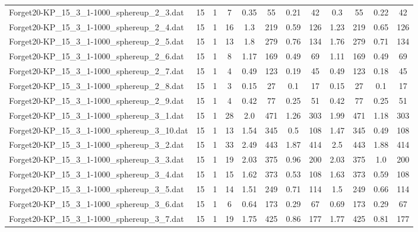 \begin{sidewaystable}[!ht]
{\begin{tabular}{lccccccccccc}
Forget20-KP\_15\_3\_1-1000\_sphereup\_2\_3.dat & 15 & 1 & 7 & 0.35 & 55 &  \textcolor{blue2}{0.21} & 42 & 0.3 & 55 & 0.22 & 42 \\
Forget20-KP\_15\_3\_1-1000\_sphereup\_2\_4.dat & 15 & 1 & 16 & 1.3 & 219 &  \textcolor{blue2}{0.59} & 126 & 1.23 & 219 & 0.65 & 126 \\
Forget20-KP\_15\_3\_1-1000\_sphereup\_2\_5.dat & 15 & 1 & 13 & 1.8 & 279 & 0.76 & 134 & 1.76 & 279 & 0.71 & 134 \\
Forget20-KP\_15\_3\_1-1000\_sphereup\_2\_6.dat & 15 & 1 & 8 & 1.17 & 169 &  \textcolor{blue2}{0.49} & 69 & 1.11 & 169 &  \textcolor{blue2}{0.49} & 69 \\
Forget20-KP\_15\_3\_1-1000\_sphereup\_2\_7.dat & 15 & 1 & 4 & 0.49 & 123 & 0.19 & 45 & 0.49 & 123 &  \textcolor{blue2}{0.18} & 45 \\
Forget20-KP\_15\_3\_1-1000\_sphereup\_2\_8.dat & 15 & 1 & 3 & 0.15 & 27 &  \textcolor{blue2}{0.1} & 17 & 0.15 & 27 &  \textcolor{blue2}{0.1} & 17 \\
Forget20-KP\_15\_3\_1-1000\_sphereup\_2\_9.dat & 15 & 1 & 4 & 0.42 & 77 &  \textcolor{blue2}{0.25} & 51 & 0.42 & 77 &  \textcolor{blue2}{0.25} & 51 \\
Forget20-KP\_15\_3\_1-1000\_sphereup\_3\_1.dat & 15 & 1 & 28 & 2.0 & 471 & 1.26 & 303 & 1.99 & 471 &  \textcolor{blue2}{1.18} & 303 \\
Forget20-KP\_15\_3\_1-1000\_sphereup\_3\_10.dat & 15 & 1 & 13 & 1.54 & 345 & 0.5 & 108 & 1.47 & 345 &  \textcolor{blue2}{0.49} & 108 \\
Forget20-KP\_15\_3\_1-1000\_sphereup\_3\_2.dat & 15 & 1 & 33 & 2.49 & 443 &  \textcolor{blue2}{1.87} & 414 & 2.5 & 443 & 1.88 & 414 \\
Forget20-KP\_15\_3\_1-1000\_sphereup\_3\_3.dat & 15 & 1 & 19 & 2.03 & 375 & 0.96 & 200 & 2.03 & 375 & 1.0 & 200 \\
Forget20-KP\_15\_3\_1-1000\_sphereup\_3\_4.dat & 15 & 1 & 15 & 1.62 & 373 &  \textcolor{blue2}{0.53} & 108 & 1.63 & 373 & 0.59 & 108 \\
Forget20-KP\_15\_3\_1-1000\_sphereup\_3\_5.dat & 15 & 1 & 14 & 1.51 & 249 & 0.71 & 114 & 1.5 & 249 &  \textcolor{blue2}{0.66} & 114 \\
Forget20-KP\_15\_3\_1-1000\_sphereup\_3\_6.dat & 15 & 1 & 6 & 0.64 & 173 &  \textcolor{blue2}{0.29} & 67 & 0.69 & 173 &  \textcolor{blue2}{0.29} & 67 \\
Forget20-KP\_15\_3\_1-1000\_sphereup\_3\_7.dat & 15 & 1 & 19 & 1.75 & 425 & 0.86 & 177 & 1.77 & 425 &  \textcolor{blue2}{0.81} & 177 \\

\end{tabular}}
\end{sidewaystable}
